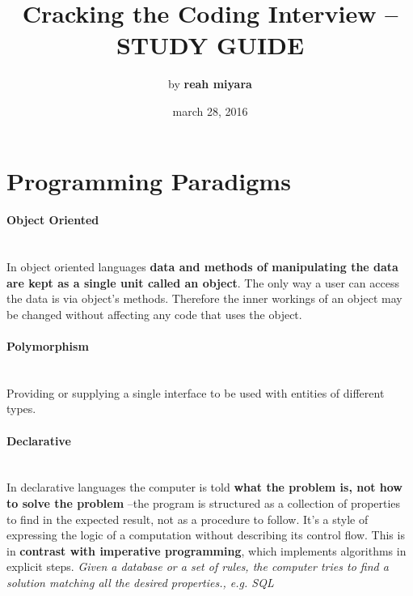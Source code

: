 \documentclass[10pt]{article}
\begin{document}
\setcounter{secnumdepth}{-1}

\title{Cracking the Coding Interview -- STUDY GUIDE}
\author{by {\bf reah miyara} }%
\date{march 28, 2016}
\maketitle

\section{Programming Paradigms}\smallskip

\paragraph{Object Oriented}\ \\
In object oriented languages {\bf data and methods of manipulating the data are kept as a single unit called an object}. The only way a user can access the data is via object's methods. Therefore the inner workings of an object may be changed without affecting any code that uses the object. 
\begin{addmargin}[3em]{2em}%

{\indent \vspace{-10pt} \paragraph{Polymorphism}\ \\
 Providing or supplying a single interface to be used with entities of different types. }
\end{addmargin}

\paragraph{Declarative}\ \\
In declarative languages the computer is told {\bf what the problem is, not how to solve the problem} --the program is structured as a collection of properties to find in the expected result, not as a procedure to follow. It's a style of expressing the logic of a computation without describing its control flow. This is in {\bf contrast with imperative programming}, which implements algorithms in explicit steps. {\it Given a database or a set of rules, the computer tries to find a solution matching all the desired properties., e.g. SQL}
\end{document}
